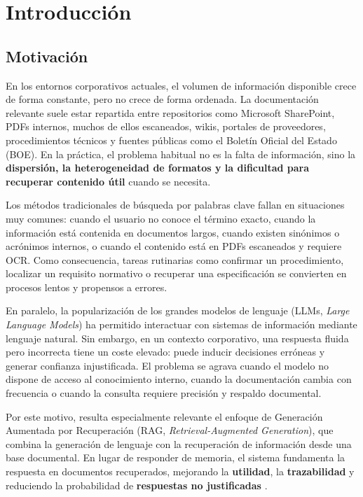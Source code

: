\chapter{Introducción}
\label{cap:intro}

\section{Motivación}

En los entornos corporativos actuales, el volumen de información disponible crece de forma constante, pero no crece de forma ordenada. La documentación relevante suele estar repartida entre repositorios como Microsoft SharePoint, PDFs internos, muchos de ellos escaneados, wikis, portales de proveedores, procedimientos técnicos y fuentes públicas como el Boletín Oficial del Estado (BOE). En la práctica, el problema habitual no es la falta de información, sino la \textbf{dispersión, la heterogeneidad de formatos y la dificultad para recuperar contenido útil} cuando se necesita.

Los métodos tradicionales de búsqueda por palabras clave fallan en situaciones muy comunes: cuando el usuario no conoce el término exacto, cuando la información está contenida en documentos largos, cuando existen sinónimos o acrónimos internos, o cuando el contenido está en PDFs escaneados y requiere OCR. Como consecuencia, tareas rutinarias como confirmar un procedimiento, localizar un requisito normativo o recuperar una especificación se convierten en procesos lentos y propensos a errores.

En paralelo, la popularización de los grandes modelos de lenguaje (LLMs, \textit{Large Language Models}) ha permitido interactuar con sistemas de información mediante lenguaje natural. Sin embargo, en un contexto corporativo, una respuesta fluida pero incorrecta tiene un coste elevado: puede inducir decisiones erróneas y generar confianza injustificada. El problema se agrava cuando el modelo no dispone de acceso al conocimiento interno, cuando la documentación cambia con frecuencia o cuando la consulta requiere precisión y respaldo documental.

Por este motivo, resulta especialmente relevante el enfoque de Generación Aumentada por Recuperación (RAG, \textit{Retrieval-Augmented Generation}), que combina la generación de lenguaje con la recuperación de información desde una base documental. En lugar de responder de memoria, el sistema fundamenta la respuesta en documentos recuperados, mejorando la \textbf{utilidad}, la \textbf{trazabilidad} y reduciendo la probabilidad de \textbf{respuestas no justificadas} \cite{lewis2020rag}.

